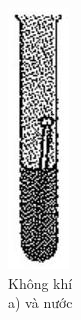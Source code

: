 \documentclass[10pt]{article}
\begin{document}
\begin{figure}[h]
\begin{center}
  \includegraphics[width=\textwidth]{2025_10_23_74efce88ce3a451fd6b0g-072}
\captionsetup{labelformat=empty}
\caption{Không khí\\
a) và nước}
\end{center}
\end{figure}
\end{document}
